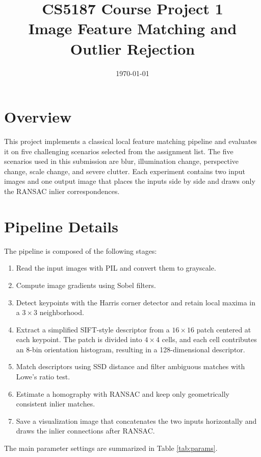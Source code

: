 \documentclass[11pt,a4paper]{article}
\title{CS5187 Course Project 1\\Image Feature Matching and Outlier Rejection}
\author{}
\date{\today}
\begin{document}
\maketitle

\section{Overview}
This project implements a classical local feature matching pipeline and evaluates it on five challenging scenarios selected from the assignment list. The five scenarios used in this submission are blur, illumination change, perspective change, scale change, and severe clutter. Each experiment contains two input images and one output image that places the inputs side by side and draws only the RANSAC inlier correspondences.

\section{Pipeline Details}
The pipeline is composed of the following stages:
\begin{enumerate}
    \item Read the input images with PIL and convert them to grayscale.
    \item Compute image gradients using Sobel filters.
    \item Detect keypoints with the Harris corner detector and retain local maxima in a $3 \times 3$ neighborhood.
    \item Extract a simplified SIFT-style descriptor from a $16 \times 16$ patch centered at each keypoint. The patch is divided into $4 \times 4$ cells, and each cell contributes an 8-bin orientation histogram, resulting in a 128-dimensional descriptor.
    \item Match descriptors using SSD distance and filter ambiguous matches with Lowe's ratio test.
    \item Estimate a homography with RANSAC and keep only geometrically consistent inlier matches.
    \item Save a visualization image that concatenates the two inputs horizontally and draws the inlier connections after RANSAC.
\end{enumerate}

The main parameter settings are summarized in Table \ref{tab:params}.
\end{document}
